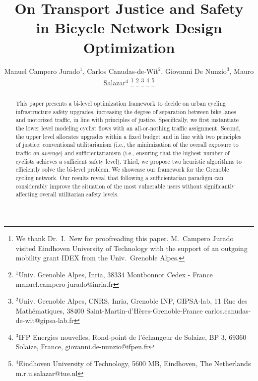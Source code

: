 \documentclass[letterpaper, 10 pt, conference]{ieeeconf}  %
\title{\LARGE \bf On Transport Justice and Safety\\ in Bicycle Network Design Optimization}
\author{Manuel Campero Jurado$^{1}$, Carlos Canudas-de-Wit$^{2}$, Giovanni De Nunzio$^{3}$, Mauro Salazar$^{4}$%
\thanks{We thank Dr.\ I.\ New for proofreading this paper. M.\ Campero Jurado visited Eindhoven University of Technology with the support of an outgoing mobility grant IDEX from the Univ.\ Grenoble Alpes.}
\thanks{$^{1}$Univ. Grenoble Alpes, Inria, 38334 Montbonnot Cedex - France
        {\footnotesize manuel.campero-jurado@inria.fr}}%
\thanks{$^{2}$Univ. Grenoble Alpes, CNRS, Inria, Grenoble INP, GIPSA-lab, 11 Rue des Mathématiques, 
38400 Saint-Martin-d'Hères-Grenoble-France
        {\footnotesize carlos.canudas-de-wit@gipsa-lab.fr}}%
\thanks{$^{3}$IFP Energies nouvelles,
Rond-point de l’échangeur de Solaize, BP 3, 69360 Solaize, France,
        {\footnotesize giovanni.de-nunzio@ifpen.fr}}%
\thanks{$^{4}$Eindhoven University of Technology, 5600 MB, Eindhoven, The Netherlands
        {\footnotesize m.r.u.salazar@tue.nl}}%
}
\begin{document}
\maketitle
\thispagestyle{plain}
\pagestyle{plain}


\begin{abstract}


This paper presents a bi-level optimization framework to decide on urban cycling infrastructure safety upgrades, increasing the degree of separation between bike lanes and motorized traffic, in line with principles of justice.
Specifically, we first instantiate the lower level modeling cyclist flows with an all-or-nothing traffic assignment.
Second, the upper level allocates upgrades within a fixed budget and in line with two principles of justice: conventional utilitarianism (i.e., the minimization of the overall exposure to traffic \textit{on average}) and sufficientarianism (i.e., ensuring that the highest number of cyclists achieves a sufficient safety level).
Third, we propose two heuristic algorithms to efficiently solve the bi-level problem.
We showcase our framework for the Grenoble cycling network. Our results reveal that following a sufficientarian paradigm can considerably improve the situation of the most vulnerable users without significantly affecting overall utilitarian safety levels.


\end{abstract}
\end{document}
